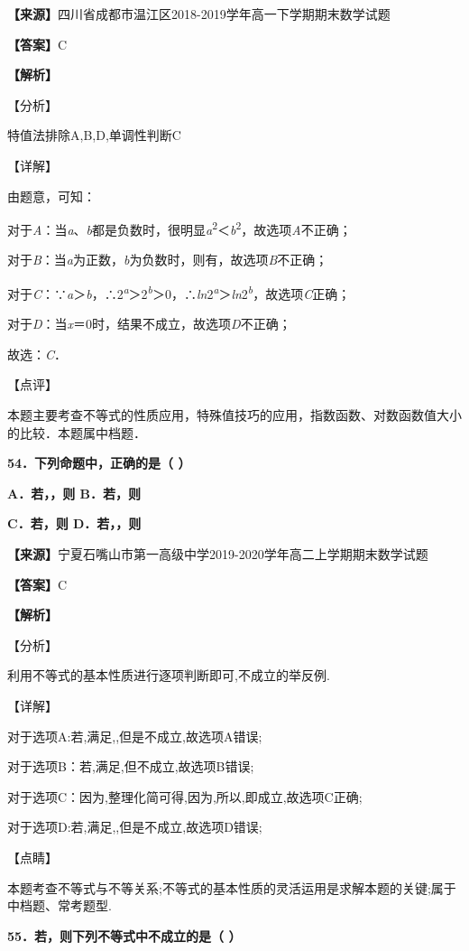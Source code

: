 \textbf{【来源】}四川省成都市温江区2018-2019学年高一下学期期末数学试题

\textbf{【答案】}C

\textbf{【解析】}

【分析】

特值法排除A,B,D,单调性判断C

【详解】

由题意，可知：

对于\emph{A}：当\emph{a}、\emph{b}都是负数时，很明显\emph{a}\textsuperscript{2}＜\emph{b}\textsuperscript{2}，故选项\emph{A}不正确；

对于\emph{B}：当\emph{a}为正数，\emph{b}为负数时，则有，故选项\emph{B}不正确；

对于\emph{C}：∵\emph{a}＞\emph{b}，∴2\emph{\textsuperscript{a}}＞2\emph{\textsuperscript{b}}＞0，∴\emph{ln}2\emph{\textsuperscript{a}}＞\emph{ln}2\emph{\textsuperscript{b}}，故选项\emph{C}正确；

对于\emph{D}：当\emph{x}＝0时，结果不成立，故选项\emph{D}不正确；

故选：\emph{C}．

【点评】

本题主要考查不等式的性质应用，特殊值技巧的应用，指数函数、对数函数值大小的比较．本题属中档题．

\textbf{54．下列命题中，正确的是（ ）}

\textbf{A．若，，则 B．若，则}

\textbf{C．若，则 D．若，，则}

\textbf{【来源】}宁夏石嘴山市第一高级中学2019-2020学年高二上学期期末数学试题

\textbf{【答案】}C

\textbf{【解析】}

【分析】

利用不等式的基本性质进行逐项判断即可,不成立的举反例.

【详解】

对于选项A:若,满足,,但是不成立,故选项A错误;

对于选项B：若,满足,但不成立,故选项B错误;

对于选项C：因为,整理化简可得,因为,所以,即成立,故选项C正确;

对于选项D:若,满足,,但是不成立,故选项D错误;

【点睛】

本题考查不等式与不等关系;不等式的基本性质的灵活运用是求解本题的关键;属于中档题、常考题型.

\textbf{55．若，则下列不等式中不成立的是（ ）}

